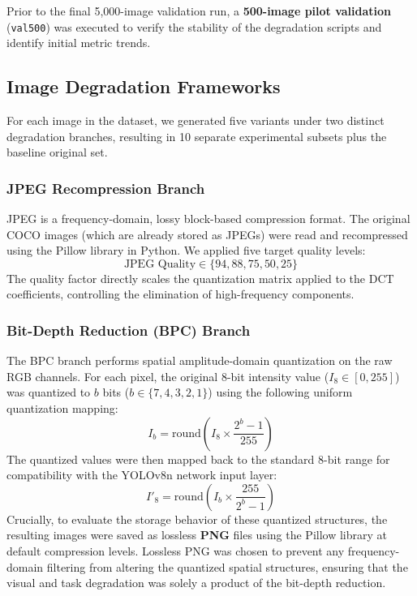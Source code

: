 \documentclass[12pt, a4paper]{article}
\begin{document}
Prior to the final 5,000-image validation run, a \textbf{500-image pilot validation} (\texttt{val500}) was executed to verify the stability of the degradation scripts and identify initial metric trends.

\subsection{Image Degradation Frameworks}
For each image in the dataset, we generated five variants under two distinct degradation branches, resulting in 10 separate experimental subsets plus the baseline original set.

\subsubsection{JPEG Recompression Branch}
JPEG is a frequency-domain, lossy block-based compression format. The original COCO images (which are already stored as JPEGs) were read and recompressed using the Pillow library in Python. We applied five target quality levels:
$$\text{JPEG Quality} \in \{94, 88, 75, 50, 25\}$$
The quality factor directly scales the quantization matrix applied to the DCT coefficients, controlling the elimination of high-frequency components.

\subsubsection{Bit-Depth Reduction (BPC) Branch}
The BPC branch performs spatial amplitude-domain quantization on the raw RGB channels. For each pixel, the original 8-bit intensity value ($I_{8} \in [0, 255]$) was quantized to $b$ bits ($b \in \{7, 4, 3, 2, 1\}$) using the following uniform quantization mapping:
\begin{equation}
I_{b} = \text{round}\left(I_{8} \times \frac{2^b - 1}{255}\right)
\label{eq:quant}
\end{equation}
The quantized values were then mapped back to the standard 8-bit range for compatibility with the YOLOv8n network input layer:
\begin{equation}
I'_{8} = \text{round}\left(I_{b} \times \frac{255}{2^b - 1}\right)
\label{eq:dequant}
\end{equation}
Crucially, to evaluate the storage behavior of these quantized structures, the resulting images were saved as lossless \textbf{PNG} files using the Pillow library at default compression levels. Lossless PNG was chosen to prevent any frequency-domain filtering from altering the quantized spatial structures, ensuring that the visual and task degradation was solely a product of the bit-depth reduction.
\end{document}
